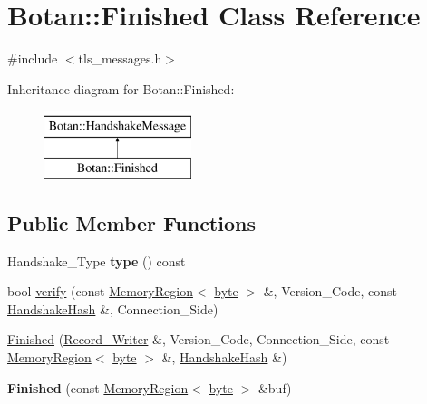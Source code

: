 \hypertarget{classBotan_1_1Finished}{\section{Botan\-:\-:Finished Class Reference}
\label{classBotan_1_1Finished}
}


{\ttfamily \#include $<$tls\-\_\-messages.\-h$>$}

Inheritance diagram for Botan\-:\-:Finished\-:\begin{figure}[H]
\begin{center}
\leavevmode
\includegraphics[height=2.000000cm]{classBotan_1_1Finished}
\end{center}
\end{figure}
\subsection*{Public Member Functions}
\begin{DoxyCompactItemize}
\item 
\hypertarget{classBotan_1_1Finished_aa726f63f4c018a40def6e750ecdb0072}{Handshake\-\_\-\-Type {\bfseries type} () const }\label{classBotan_1_1Finished_aa726f63f4c018a40def6e750ecdb0072}

\item 
bool \hyperlink{classBotan_1_1Finished_a693e3dcbbf10fa1b726f25208d52e791}{verify} (const \hyperlink{classBotan_1_1MemoryRegion}{Memory\-Region}$<$ \hyperlink{namespaceBotan_a7d793989d801281df48c6b19616b8b84}{byte} $>$ \&, Version\-\_\-\-Code, const \hyperlink{classBotan_1_1HandshakeHash}{Handshake\-Hash} \&, Connection\-\_\-\-Side)
\item 
\hyperlink{classBotan_1_1Finished_a1fe78c32267d2d868c73faf848dfb59a}{Finished} (\hyperlink{classBotan_1_1Record__Writer}{Record\-\_\-\-Writer} \&, Version\-\_\-\-Code, Connection\-\_\-\-Side, const \hyperlink{classBotan_1_1MemoryRegion}{Memory\-Region}$<$ \hyperlink{namespaceBotan_a7d793989d801281df48c6b19616b8b84}{byte} $>$ \&, \hyperlink{classBotan_1_1HandshakeHash}{Handshake\-Hash} \&)
\item 
\hypertarget{classBotan_1_1Finished_a75019f23560efa6e07ac6601fbed32a3}{{\bfseries Finished} (const \hyperlink{classBotan_1_1MemoryRegion}{Memory\-Region}$<$ \hyperlink{namespaceBotan_a7d793989d801281df48c6b19616b8b84}{byte} $>$ \&buf)}\label{classBotan_1_1Finished_a75019f23560efa6e07ac6601fbed32a3}

\end{DoxyCompactItemize}


